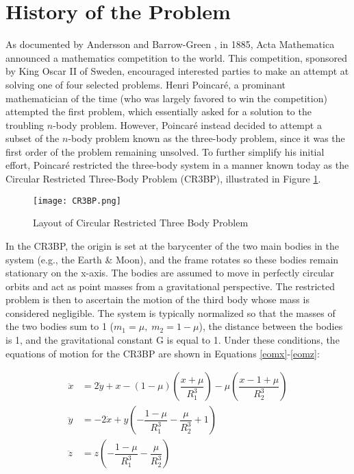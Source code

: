 \documentclass[11pt]{article} %
\begin{document}
\section*{History of the Problem} %
As documented by Andersson and Barrow-Green \cite{Andersson1994,BarrowGreen1994}, in 1885, Acta Mathematica announced a mathematics competition to the world. This competition, sponsored by King Oscar II of Sweden, encouraged interested parties to make an attempt at solving one of four selected problems. Henri Poincaré, a prominant mathematician of the time (who was largely favored to win the competition) attempted the first problem, which essentially asked for a solution to the troubling $n$-body problem. However, Poincaré instead decided to attempt a subset of the $n$-body problem known as the three-body problem, since it was the first order of the problem remaining unsolved. To further simplify his initial effort, Poincaré restricted the three-body system in a manner known today as the Circular Restricted Three-Body Problem (CR3BP), illustrated in Figure \ref{fig:CR3BP}. 

\begin{figure}[H]
\centering
\texttt{[image: CR3BP.png]}\nonumber
\caption{Layout of Circular Restricted Three Body Problem \cite{KoonLoMarsdenRoss2011}}
\label{fig:CR3BP}
\end{figure}

In the CR3BP, the origin is set at the barycenter of the two main bodies in the system (e.g., the Earth \& Moon), and the frame rotates so these bodies remain stationary on the x-axis. The bodies are assumed to move in perfectly circular orbits and act as point masses from a gravitational perspective. The restricted problem is then to ascertain the motion of the third body whose mass is considered negligible. The system is typically normalized so that the masses of the two bodies sum to 1 ($m_1 = \mu,\; m_2 = 1-\mu$), the distance between the bodies is 1, and the gravitational constant G is equal to 1. Under these conditions, the equations of motion for the CR3BP are shown in Equations \ref{eomx}-\ref{eomz}:

\begin{align}
\ddot{x} &=  2\dot{y} + x - (1-\mu)\left(\dfrac{x+\mu}{R_1^3}\right) - \mu\left(\dfrac{x-1+\mu}{R_2^3}\right) \label{eomx}\\
\ddot{y} &= - 2\dot{x} + y\left(-\dfrac{1-\mu}{R_1^3} - \dfrac{\mu}{R_2^3} + 1\right) \label{eomy}\\
\ddot{z} &= z\left(-\dfrac{1 - \mu}{R_1^3} - \dfrac{\mu}{R_2^3}\right) \label{eomz}
\end{align}
\end{document}
